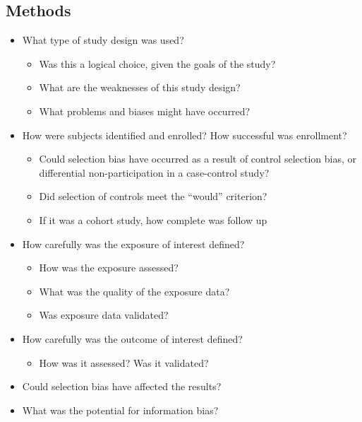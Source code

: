 \documentclass[
]{book}
\providecommand{\tightlist}{%
  \setlength{\itemsep}{0pt}\setlength{\parskip}{0pt}}
\begin{document}
\hypertarget{methods}{%
\subsection{Methods}\label{methods}}

\begin{itemize}
\tightlist
\item
  What type of study design was used?

  \begin{itemize}
  \tightlist
  \item
    Was this a logical choice, given the goals of the study?
  \item
    What are the weaknesses of this study design?
  \item
    What problems and biases might have occurred?
  \end{itemize}
\item
  How were subjects identified and enrolled? How successful was enrollment?

  \begin{itemize}
  \tightlist
  \item
    Could selection bias have occurred as a result of control selection bias, or differential non-participation in a case-control study?
  \item
    Did selection of controls meet the ``would'' criterion?
  \item
    If it was a cohort study, how complete was follow up
  \end{itemize}
\item
  How carefully was the exposure of interest defined?

  \begin{itemize}
  \tightlist
  \item
    How was the exposure assessed?
  \item
    What was the quality of the exposure data?
  \item
    Was exposure data validated?
  \end{itemize}
\item
  How carefully was the outcome of interest defined?

  \begin{itemize}
  \tightlist
  \item
    How was it assessed? Was it validated?
  \end{itemize}
\item
  Could selection bias have affected the results?
\item
  What was the potential for information bias?


\end{itemize}
\end{document}
